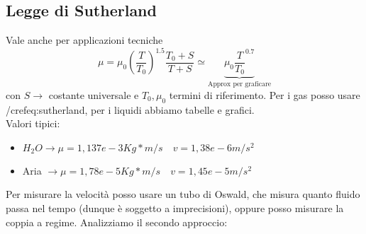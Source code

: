 \subsection{Legge di Sutherland}
Vale anche per applicazioni tecniche
\begin{equation}
  \label{eq:sutherland}
  \mu =\mu_0 (\frac{T}{T_0})^{1.5} \frac{T_0+S}{T+S} \simeq \underbrace{\mu_0\frac{T}{T_0}^{0.7}}_{\text{Approx per graficare}}
\end{equation}
con $S \to $ costante universale e $T_0,\mu_0$ termini di riferimento.
Per i gas posso usare /cref{eq:sutherland}, per i liquidi abbiamo tabelle e grafici.\\
Valori tipici:
\begin{itemize}
\item $ H_{2}O \to \mu =1,137e-3 \unit{Kg*m/s} \quad v = 1,38e-6 \unit{m/s^2}$ 
\item Aria $\to \mu =1,78e-5 \unit{Kg*m/s} \quad v = 1,45e-5 \unit{m/s^2}$ 
\end{itemize}
Per misurare la velocità posso usare un tubo di Oswald, che misura quanto fluido passa nel tempo (dunque è soggetto a imprecisioni), oppure posso misurare la coppia a regime.
Analizziamo il secondo approccio:

